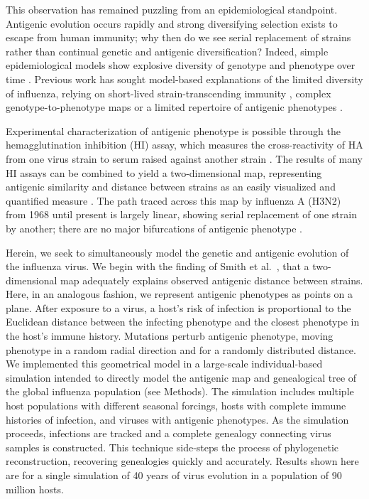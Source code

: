 This observation has remained puzzling from an epidemiological standpoint.  Antigenic evolution occurs rapidly and strong diversifying selection exists to escape from human immunity; why then do we see serial replacement of strains rather than continual genetic and antigenic diversification?  Indeed, simple epidemiological models show explosive diversity of genotype and phenotype over time \cite{Ferguson03,Tria05}.  Previous work has sought model-based explanations of the limited diversity of influenza, relying on short-lived strain-transcending immunity \cite{Ferguson03,Tria05}, complex genotype-to-phenotype maps \cite{Koelle06} or a limited repertoire of antigenic phenotypes \cite{Recker07}. 

Experimental characterization of antigenic phenotype is possible through the hemagglutination inhibition (HI) assay, which measures the cross-reactivity of HA from one virus strain to serum raised against another strain \cite{Hirst43}.  The results of many HI assays can be combined to yield a two-dimensional map, representing antigenic similarity and distance between strains as an easily visualized and quantified measure \cite{Smith04}.  The path traced across this map by influenza A (H3N2) from 1968 until present is largely linear, showing serial replacement of one strain by another; there are no major bifurcations of antigenic phenotype \cite{Smith04}.

Herein, we seek to simultaneously model the genetic and antigenic evolution of the influenza virus.  We begin with the finding of Smith et al.\ \cite{Smith04}, that a two-dimensional map adequately explains observed antigenic distance between strains.  Here, in an analogous fashion, we represent antigenic phenotypes as points on a plane.  After exposure to a virus, a host's risk of infection is proportional to the Euclidean distance between the infecting phenotype and the closest phenotype in the host's immune history.  Mutations perturb antigenic phenotype, moving phenotype in a random radial direction and for a randomly distributed distance.  We implemented this geometrical model in a large-scale individual-based simulation intended to directly model the antigenic map and genealogical tree of the global influenza population (see Methods).  The simulation includes multiple host populations with different seasonal forcings, hosts with complete immune histories of infection, and viruses with antigenic phenotypes.  As the simulation proceeds, infections are tracked and a complete genealogy connecting virus samples is constructed.  This technique side-steps the process of phylogenetic reconstruction, recovering genealogies quickly and accurately.  Results shown here are for a single simulation of 40 years of virus evolution in a population of 90 million hosts.  

